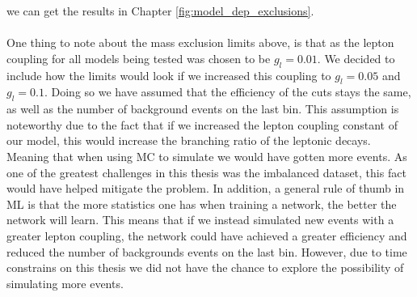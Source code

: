 \documentclass[12pt, a4paper]{book}
\begin{document}
we can get the results in Chapter \ref{fig:model_dep_exclusions}.\\
\\One thing to note about the mass exclusion limits above, is that as the lepton coupling for all models being tested was chosen to be $g_l=0.01$. We decided to include how the limits would look if we increased this coupling 
to $g_l=0.05$ and $g_l=0.1$. Doing so we have assumed that the efficiency of the cuts stays the same, as well as the number of background events on the last bin. This assumption is noteworthy due to the fact that if we increased the lepton coupling constant of our model, this would increase the branching ratio 
of the leptonic decays. Meaning that when using MC to simulate we would have gotten more events. As one of the greatest challenges in this thesis was the imbalanced dataset, this fact would have helped mitigate the problem. 
In addition, a general rule of thumb in ML is that the more statistics one has when training a network, the better the network will learn. 
This means that if we instead simulated new events with a greater lepton coupling, the network could have achieved a greater efficiency and reduced the number of backgrounds events on the last bin. However, due to time constrains on this thesis we did not have the chance to explore the possibility of simulating more events.
\clearpage
\end{document}
